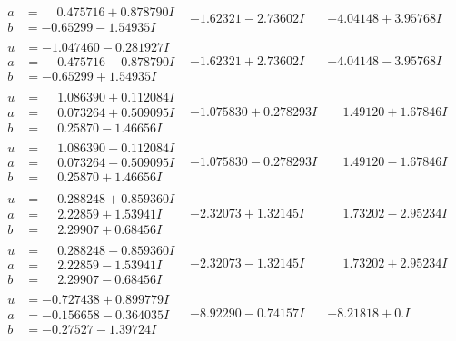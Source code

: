 \documentclass[1p]{elsarticle_modified}
\theoremstyle{definition}
\begin{document}
$$\begin{array}{c|c|c}
\begin{aligned}
a &= \phantom{-}0.475716 + 0.878790 I \\
b &= -0.65299 - 1.54935 I\end{aligned}
 & -1.62321 - 2.73602 I & -4.04148 + 3.95768 I \\ \hline\begin{aligned}
u &= -1.047460 - 0.281927 I \\
a &= \phantom{-}0.475716 - 0.878790 I \\
b &= -0.65299 + 1.54935 I\end{aligned}
 & -1.62321 + 2.73602 I & -4.04148 - 3.95768 I \\ \hline\begin{aligned}
u &= \phantom{-}1.086390 + 0.112084 I \\
a &= \phantom{-}0.073264 + 0.509095 I \\
b &= \phantom{-}0.25870 - 1.46656 I\end{aligned}
 & -1.075830 + 0.278293 I & \phantom{-}1.49120 + 1.67846 I \\ \hline\begin{aligned}
u &= \phantom{-}1.086390 - 0.112084 I \\
a &= \phantom{-}0.073264 - 0.509095 I \\
b &= \phantom{-}0.25870 + 1.46656 I\end{aligned}
 & -1.075830 - 0.278293 I & \phantom{-}1.49120 - 1.67846 I \\ \hline\begin{aligned}
u &= \phantom{-}0.288248 + 0.859360 I \\
a &= \phantom{-}2.22859 + 1.53941 I \\
b &= \phantom{-}2.29907 + 0.68456 I\end{aligned}
 & -2.32073 + 1.32145 I & \phantom{-}1.73202 - 2.95234 I \\ \hline\begin{aligned}
u &= \phantom{-}0.288248 - 0.859360 I \\
a &= \phantom{-}2.22859 - 1.53941 I \\
b &= \phantom{-}2.29907 - 0.68456 I\end{aligned}
 & -2.32073 - 1.32145 I & \phantom{-}1.73202 + 2.95234 I \\ \hline\begin{aligned}
u &= -0.727438 + 0.899779 I \\
a &= -0.156658 - 0.364035 I \\
b &= -0.27527 - 1.39724 I\end{aligned}
 & -8.92290 - 0.74157 I & -8.21818 + 0. I\phantom{ +0.000000I} \\ \hline\begin{aligned}

\end{aligned}
\end{array}$$
\end{document}
